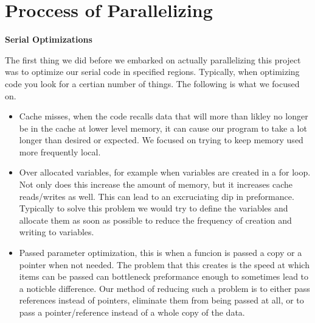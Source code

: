 \chapter*{Proccess of Parallelizing}

\begin{center}
    \Large\textbf{Serial Optimizations}\\
\end{center}
    The first thing we did before we embarked on actually parallelizing this project was to optimize our serial code in specified regions. Typically, when optimizing code you look for a certian number of things. The following is what we focused on. 

\begin{itemize}
    \item Cache misses, when the code recalls data that will more than likley no longer be in the cache at lower level memory, it can cause our program to take a lot longer than desired or expected. We focused on trying to keep memory used more frequently local.  
    \item Over allocated variables, for example when variables are created in a for loop. Not only does this increase the amount of memory, but it increases cache reads/writes as well. This can lead to an excruciating dip in preformance. Typically to solve this problem we would try to define the variables and allocate them as soon as possible to reduce the frequency of creation and writing to variables.
    \item Passed parameter optimization, this is when a funcion is passed a copy or a pointer when not needed. The problem that this creates is the speed at which items can be passed can bottleneck preformance enough to sometimes lead to a noticble difference. Our method of reducing such a problem is to either pass references instead of pointers, eliminate them from being passed at all, or to pass a pointer/reference instead of a whole copy of the data.
\end{itemize}
